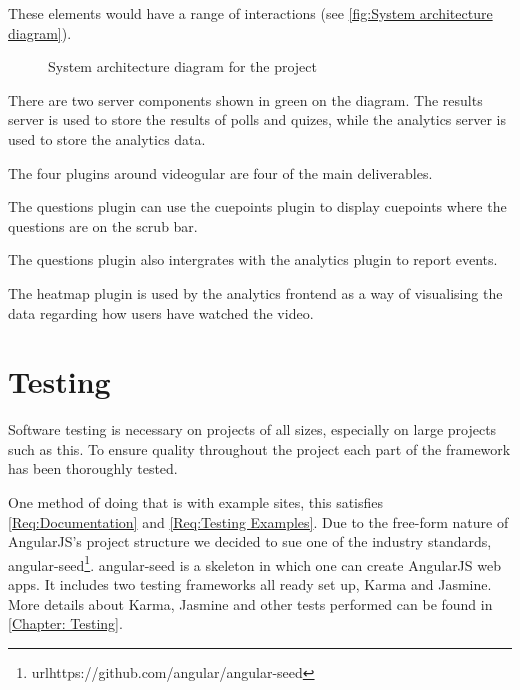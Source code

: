 These elements would have a range of interactions (see \autoref{fig:System architecture diagram}).

\begin{figure}[h!]
\centering

\caption{System architecture diagram for the project \label{fig:System architecture diagram}}
\end{figure}




There are two server components shown in green on the diagram. The results server is used to store the results of polls and quizes, while the analytics server is used to store the analytics data.

The four plugins around videogular are four of the main deliverables.

The questions plugin can use the cuepoints plugin to display cuepoints where the questions are on the scrub bar.

The questions plugin also intergrates with the analytics plugin to report events.

The heatmap plugin is used by the analytics frontend as a way of visualising the data regarding how users have watched the video.

\section{Testing}
\label{Section:Overall_Testing}

Software testing is necessary on projects of all sizes, especially on large projects such as this. To ensure quality throughout the project each part of the framework has been thoroughly tested.

One method of doing that is with example sites, this satisfies \cref{Req:Documentation} and \cref{Req:Testing Examples}. Due to the free-form nature of AngularJS's project structure we decided to sue one of the industry standards, angular-seed\footnote{url{https://github.com/angular/angular-seed}}. angular-seed is a skeleton in which one can create AngularJS web apps. It includes two testing frameworks all ready set up, Karma and Jasmine. More details about Karma, Jasmine and other tests performed can be found in \autoref{Chapter: Testing}.

